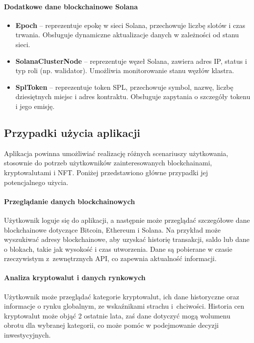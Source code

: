 \paragraph{Dodatkowe dane blockchainowe Solana}
\begin{itemize}
\item \textbf{Epoch} -- reprezentuje epokę w sieci Solana, przechowuje liczbę slotów i czas trwania. Obsługuje dynamiczne aktualizacje danych w zależności od stanu sieci.
\item \textbf{SolanaClusterNode} -- reprezentuje węzeł Solana, zawiera adres IP, status i typ roli (np. walidator). Umożliwia monitorowanie stanu węzłów klastra.
\item \textbf{SplToken} -- reprezentuje token SPL, przechowuje symbol, nazwę, liczbę dziesiętnych miejsc i adres kontraktu. Obsługuje zapytania o szczegóły tokenu i jego emisję.
\end{itemize}

\subsection{Przypadki użycia aplikacji}
Aplikacja powinna umożliwiać realizację różnych scenariuszy użytkowania, stosownie do potrzeb użytkowników zainteresowanych blockchainami, kryptowalutami i NFT. Poniżej przedstawiono główne przypadki jej potencjalnego użycia.

\paragraph{Przeglądanie danych blockchainowych}
Użytkownik loguje się do aplikacji, a następnie może przeglądać szczegółowe dane blockchainowe dotyczące Bitcoin, Ethereum i Solana. Na przykład może wyszukiwać adresy blockchainowe, aby uzyskać historię transakcji, saldo lub dane o blokach, takie jak wysokość i czas utworzenia. Dane są pobierane w czasie rzeczywistym z~zewnętrznych API, co zapewnia aktualność informacji.

\paragraph{Analiza kryptowalut i danych rynkowych}
Użytkownik może przeglądać kategorie kryptowalut, ich dane historyczne oraz informacje o rynku globalnym, ze wskaźnikami strachu i~chciwości. Historia cen kryptowalut może objąć 2 ostatnie lata, zaś dane dotyczyć mogą wolumenu obrotu dla wybranej kategorii, co może pomóc w podejmowanie decyzji inwestycyjnych.

